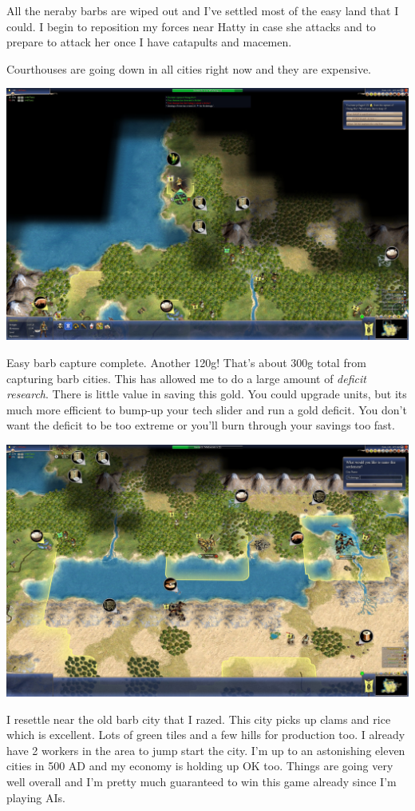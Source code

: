 \documentclass[10pt]{article}
\begin{document}
All the neraby barbs are wiped out and I've settled most of the easy land that I could. I begin to reposition my forces
near Hatty in case she attacks and to prepare to attack her once I have catapults and macemen.

Courthouses are going down in all cities right now and they are expensive.

\includegraphics[width=1.0\textwidth]{105}

Easy barb capture complete. Another 120g! That's about 300g total from capturing barb cities. This has allowed
me to do a large amount of \emph{deficit research}. There is little value in saving this gold. You could upgrade units,
but its much more efficient to bump-up your tech slider and run a gold deficit. You don't want the deficit to be
too extreme or you'll burn through your savings too fast.

\includegraphics[width=1.0\textwidth]{106}

I resettle near the old barb city that I razed. This city picks up clams and rice which is excellent. Lots of green tiles
and a few hills for production too. I already have 2 workers in the area to jump start the city. I'm up to an astonishing
eleven cities in 500 AD and my economy is holding up OK too. Things are going very well overall and I'm pretty much
guaranteed to win this game already since I'm playing AIs.
\end{document}
